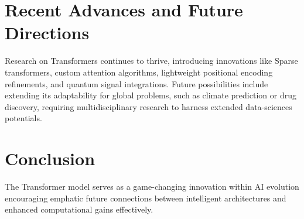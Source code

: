 \documentclass{article}
\begin{document}
\section{Recent Advances and Future Directions}
Research on Transformers continues to thrive, introducing innovations like Sparse transformers, custom attention algorithms, lightweight positional encoding refinements, and quantum signal integrations. Future possibilities include extending its adaptability for global problems, such as climate prediction or drug discovery, requiring multidisciplinary research to harness extended data-sciences potentials.

\section{Conclusion}
The Transformer model serves as a game-changing innovation within AI evolution encouraging emphatic future connections between intelligent architectures and enhanced computational gains effectively.
\end{document}
